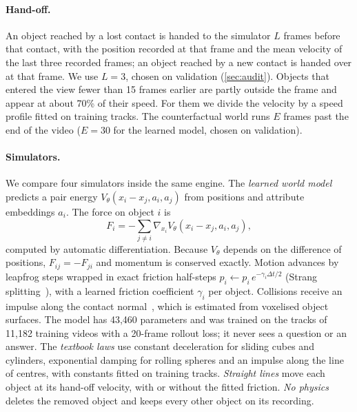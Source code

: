 \IfFileExists{TMLR}{\documentclass[10pt]{article}}%
\begin{document}
\paragraph{Hand-off.}
An object reached by a lost contact is handed to the simulator $L$ frames before that contact, with the position recorded at that frame and the mean velocity of the last three recorded frames; an object reached by a new contact is handed over at that frame.
We use $L=3$, chosen on validation (\cref{sec:audit}).
Objects that entered the view fewer than 15 frames earlier are partly outside the frame and appear at about 70\% of their speed.
For them we divide the velocity by a speed profile fitted on training tracks.
The counterfactual world runs $E$ frames past the end of the video ($E=30$ for the learned model, chosen on validation).

\paragraph{Simulators.}
We compare four simulators inside the same engine.
The \emph{learned world model} predicts a pair energy $V_\theta(x_i - x_j, a_i, a_j)$ from positions and attribute embeddings $a_i$.
The force on object $i$ is
\begin{equation}
F_i = -\sum_{j \neq i} \nabla_{x_i} V_\theta(x_i - x_j, a_i, a_j),
\end{equation}
computed by automatic differentiation.
Because $V_\theta$ depends on the difference of positions, $F_{ij} = -F_{ji}$ and momentum is conserved exactly.
Motion advances by leapfrog steps wrapped in exact friction half-steps $p_i \leftarrow p_i\, e^{-\gamma_i \Delta t/2}$ (Strang splitting~\cite{hairer2006geometric}), with a learned friction coefficient $\gamma_i$ per object.
Collisions receive an impulse along the contact normal~\cite{mirtich1995impulse}, which is estimated from voxelised object surfaces.
The model has 43,460 parameters and was trained on the tracks of 11,182 training videos with a 20-frame rollout loss; it never sees a question or an answer.
The \emph{textbook laws} use constant deceleration for sliding cubes and cylinders, exponential damping for rolling spheres and an impulse along the line of centres, with constants fitted on training tracks.
\emph{Straight lines} move each object at its hand-off velocity, with or without the fitted friction.
\emph{No physics} deletes the removed object and keeps every other object on its recording.
\end{document}
